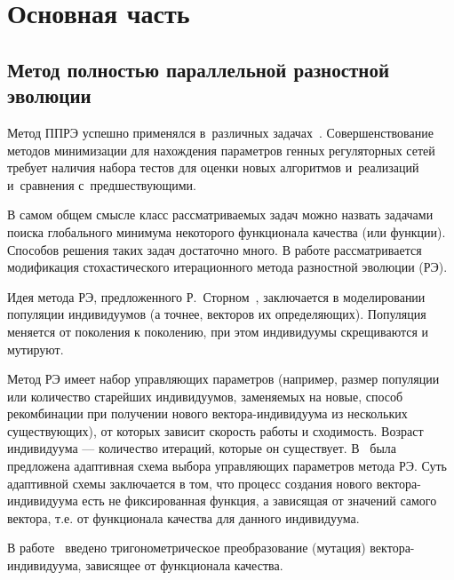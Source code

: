\chapter*{Основная часть} %

\section{Метод полностью параллельной разностной эволюции} \label{s1}

Метод ППРЭ успешно применялся в~различных задачах~\cite{bib3,bib4}.
Совершенствование методов минимизации для нахождения параметров генных 
регуляторных сетей требует наличия набора тестов для оценки новых алгоритмов 
и~реализаций и~сравнения с~предшествующими. 

В самом общем смысле класс рассматриваемых задач можно назвать задачами 
поиска глобального минимума некоторого функционала качества (или функции). 
Способов решения таких задач достаточно много. В работе рассматривается 
модификация стохастического итерационного метода разностной эволюции (РЭ). 

Идея метода РЭ, предложенного Р.~Сторном~\cite{bib1}, заключается в 
моделировании популяции индивидуумов (а точнее, векторов их определяющих). 
Популяция меняется от поколения к поколению, при этом индивидуумы скрещиваются 
и мутируют. 

Метод РЭ имеет набор управляющих параметров (например, размер популяции 
или количество старейших индивидуумов, заменяемых на новые, способ рекомбинации 
при получении нового вектора-индивидуума из нескольких существующих), от которых  
зависит скорость работы и сходимость. Возраст индивидуума — количество итераций,
которые он существует. В~\cite{bibZaharie} была предложена адаптивная схема 
выбора управляющих параметров метода РЭ. Суть адаптивной схемы заключается в том,
что процесс создания нового вектора-индивидуума есть не фиксированная функция, 
а зависящая от значений самого вектора, т.е. от функционала качества для данного 
индивидуума. 

В работе~\cite{bibTM} введено тригонометрическое преобразование (мутация) 
вектора-индивидуума, зависящее от функционала качества. 

